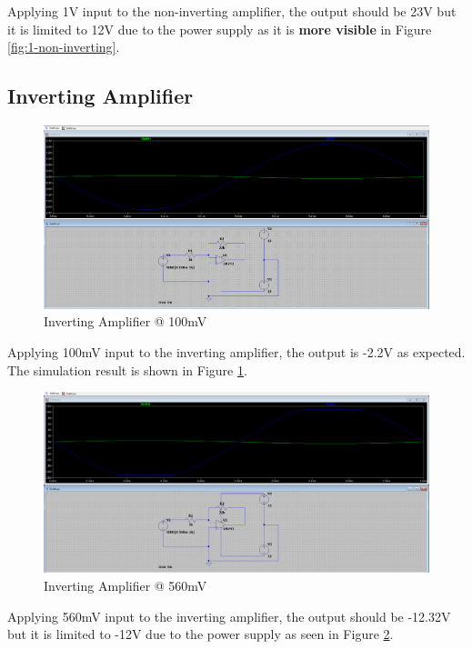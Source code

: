 Applying 1V input to the non-inverting amplifier, the output should be 23V but it is limited to 12V due to the power supply as it is \textbf{more visible} in Figure \ref{fig:1-non-inverting}.

\newpage
\thispagestyle{plain}

\subsection{Inverting Amplifier}

\begin{figure}[h]
    \centering
    \includegraphics[width=1\textwidth]{assets/100m-inverting.png}
    \caption{Inverting Amplifier @ 100mV}
    \label{fig:100m-inverting}
\end{figure}

Applying 100mV input to the inverting amplifier, the output is -2.2V as expected. The simulation result is shown in Figure \ref{fig:100m-inverting}.

\begin{figure}[h]
    \centering
    \includegraphics[width=1\textwidth]{assets/560m-inverting.png}
    \caption{Inverting Amplifier @ 560mV}
    \label{fig:560m-inverting}
\end{figure}

Applying 560mV input to the inverting amplifier, the output should be -12.32V but it is limited to -12V due to the power supply as seen in Figure \ref{fig:560m-inverting}.

